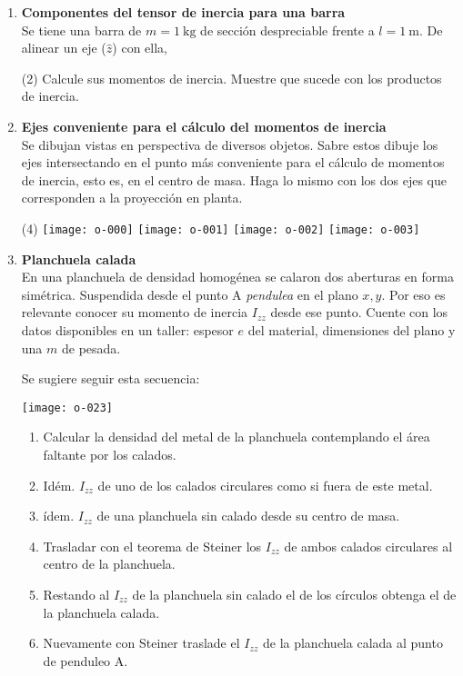\documentclass[11pt, spanish, a4paper, twoside]{article}
\begin{document}
\begin{enumerate}
	\item
	\textbf{Componentes del tensor de inercia para una barra}\\
	Se tiene una barra de \(m= \SI{1}{\kilo\gram}\) de sección despreciable frente a \(l= \SI{1}{\metre}\).
	De alinear un eje (\(\hat{z}\)) con ella, 
	\begin{tasks}(2)
		\task	Calcule sus momentos de inercia.
		\task Muestre que sucede con los productos de inercia. 
	\end{tasks}


	\item
	\textbf{Ejes conveniente para el cálculo del momentos de inercia}\\
	Se dibujan vistas en perspectiva de diversos objetos.
	Sabre estos dibuje los ejes intersectando en el punto más conveniente para el cálculo de momentos de inercia, esto es, en el centro de masa.
	Haga lo mismo con los dos ejes que corresponden a la proyección en planta.
	\vspace{-0.8cm}
	\begin{tasks}(4)
		\task \texttt{[image: o-000]}
		\task \texttt{[image: o-001]}
		\task \texttt{[image: o-002]}
		\task \texttt{[image: o-003]}
	\end{tasks}


	\item 
		\begin{minipage}[t][4cm]{0.5\textwidth}
			\textbf{Planchuela calada}\\
			En una planchuela de densidad homogénea se calaron dos aberturas en forma simétrica.
			Suspendida desde el punto A \emph{pendulea} en el plano \(x,y\).
			Por eso es relevante conocer su momento de inercia \(I_{zz}\) desde ese punto.
			Cuente con los datos disponibles en un taller: espesor $e$ del material, dimensiones del plano y una $m$ de pesada. 

			Se sugiere seguir esta secuencia:			
		\end{minipage}
		\begin{minipage}[c][2cm][t]{0.45\textwidth}
			\texttt{[image: o-023]}
		\end{minipage}
			\begin{enumerate}
				\item Calcular la densidad del metal de la planchuela contemplando el área faltante por los calados.
				\item Idém. \(I_{zz}\) de uno de los calados circulares como si fuera de este metal.
				\item ídem. \(I_{zz}\) de una planchuela sin calado desde su centro de masa.
				\item Trasladar con el teorema de Steiner los \(I_{zz}\) de ambos calados circulares al centro de la planchuela.
				\item Restando al \(I_{zz}\) de la planchuela sin calado el de los círculos obtenga el de la planchuela calada.
				\item Nuevamente con Steiner traslade el \(I_{zz}\) de la planchuela calada al punto de penduleo A.
			\end{enumerate}



\end{enumerate}
\end{document}
